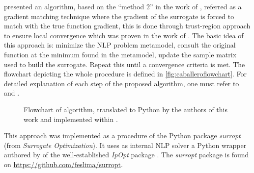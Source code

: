 \documentclass[../msc-thesis.tex]{subfiles}
\begin{document}
\textcite{Caballero2008} presented an algorithm, based on the ``method 2'' 
in the work of \textcite{Jones2001}, referred as a gradient matching 
technique where the gradient of the surrogate is forced to match with 
the true function gradient, this is done through trust-region approach to 
ensure local convergence which was proven in the work of 
\textcite{Alexandrov2000}. The basic idea of this approach is: minimize the 
NLP problem metamodel, consult the original function at the minimum found in 
the metamodel, update the sample matrix used to build the surrogate. Repeat 
this until a convergence criteria is met. The flowchart depicting the 
whole procedure is defined in \autoref{fig:caballeroflowchart}. For detailed 
explanation of each step of the proposed algorithm, one must refer to 
\textcite{Caballero2008} and \textcite{Alves2018}.

\begin{figure}[htb]
    \caption{Flowchart of \textcite{Caballero2008} algorithm, translated to 
    Python by the authors of this work and implemented within \mtc.}
    \centering
    \label{fig:caballeroflowchart}
\end{figure}

This approach was implemented as a procedure of the Python package 
\textit{surropt} (from \textit{Surrogate Optimization}). It uses as 
internal NLP solver a Python wrapper authored by \textcite{Cyipopt2019} of 
the well-established \textit{IpOpt} package \cite{Wachter2006}. The 
\textit{surropt} package is found on \url{https://github.com/feslima/surropt}.
\end{document}
